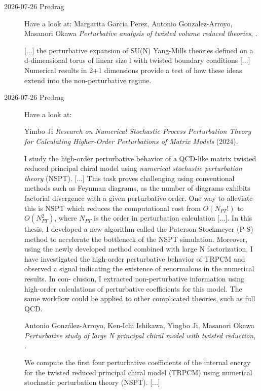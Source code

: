 \begin{description}

\item[2026-07-26 Predrag] Have a look at:
Margarita Garcia Perez, Antonio Gonzalez-Arroyo, Masanori Okawa
\emph{Perturbative analysis of twisted volume reduced theories},
.

[...] the perturbative expansion of SU(N) Yang-Mills theories defined on a d-dimensional torus of linear size l with twisted boundary conditions
[...] Numerical results in 2+1 dimensions provide a test of how these ideas extend into the non-perturbative regime.


\item[2026-07-26 Predrag] Have a look at:

Yimbo Ji
{\em Research on Numerical Stochastic Process Perturbation Theory for Calculating Higher-Order Perturbations of Matrix Models}
 (2024).

 I study the high-order perturbative behavior of a QCD-like 
 matrix  twisted reduced principal chiral model using \emph{numerical stochastic perturbation theory} (NSPT). 
 [...] This task proves challenging using conventional methods such as 
 Feynman diagrams, as the number of diagrams exhibits factorial divergence with a given perturbative order.
One way to alleviate this is NSPT which reduces the computational cost
from $O(N_{PT}!)$ to $O(N^2_{PT})$, where  $N_{PT}$ is the order in perturbation calculation
[...]. In this thesis,
I developed a new algorithm called the Paterson-Stockmeyer (P-S) method to accelerate the
bottleneck of the NSPT simulation. Moreover, using the newly developed method combined
with large N factorization, I have investigated the high-order perturbative behavior of TRPCM
and observed a signal indicating the existence of renormalons in the numerical results. In con-
clusion, I extracted non-perturbative information using high-order calculations of perturbative
coefficients for this model. The same workflow could be applied to other complicated
theories, such as full QCD.

Antonio González-Arroyo, Ken-Ichi Ishikawa, Yingbo Ji, Masanori Okawa
\emph{Perturbative study of large N principal chiral model with twisted reduction},
.

We compute the first four perturbative coefficients of the internal energy for the twisted reduced principal chiral model (TRPCM) using numerical stochastic perturbation theory (NSPT). [...]


\end{description}
